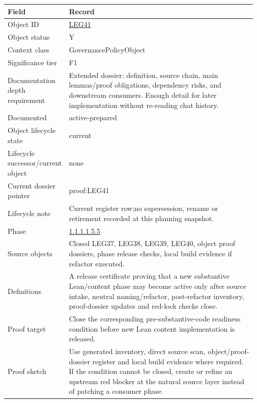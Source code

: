 \begin{longtable}{L{0.16\linewidth} L{0.81\linewidth}}
\hline
\textbf{Field} & \textbf{Record}\\
\hline
Object ID & \hyperlink{object-row-LEG41}{LEG41}\\
\hline\addlinespace[0.20em]
Object status & Y\\
\hline\addlinespace[0.20em]
Context class & GovernancePolicyObject\\
\hline\addlinespace[0.20em]
Significance tier & F1\\
\hline\addlinespace[0.20em]
Documentation depth requirement & Extended dossier: definition, source chain, main lemmas/\allowbreak{}proof obligations, dependency risks, and downstream consumers. Enough detail for later implementation without re-reading chat history.\\
\hline\addlinespace[0.20em]
Documented & active-prepared\\
\hline\addlinespace[0.20em]
Object lifecycle state & current\\
\hline\addlinespace[0.20em]
Lifecycle successor/\allowbreak{}current object & none\\
\hline\addlinespace[0.20em]
Current dossier pointer & proof:LEG41\\
\hline\addlinespace[0.20em]
Lifecycle note & Current register row;\newline no supersession, rename or retirement recorded at this planning snapshot.\\
\hline\addlinespace[0.20em]
Phase & \hyperlink{phase-row-1-1-1-1-5-5}{1.1.1.1.5.5}\\
\hline\addlinespace[0.20em]
Source objects & Closed LEG37, LEG38, LEG39, LEG40, object proof dossiers, phase release checks, local build evidence if refactor executed.\\
\hline\addlinespace[0.20em]
Definitions & A release certificate proving that a new substantive Lean/\allowbreak{}content phase may become active only after source intake, neutral naming/\allowbreak{}refactor, post-refactor inventory, proof-dossier updates and red-lock checks close.\\
\hline\addlinespace[0.20em]
Proof target & Close the corresponding pre-substantive-code readiness condition before new Lean content implementation is released.\\
\hline\addlinespace[0.20em]
Proof sketch & Use generated inventory, direct source scan, object/\allowbreak{}proof-dossier register and local build evidence where required. If the condition cannot be closed, create or refine an upstream red blocker at the natural source layer instead of patching a consumer phase.\\

\end{longtable}
